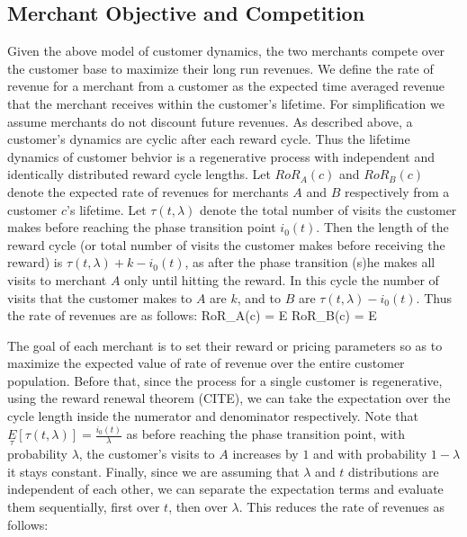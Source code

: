 \subsection{Merchant Objective and Competition}
Given the above model of customer dynamics, the two merchants compete over the customer base to maximize their long run revenues.
We define the rate of revenue for a merchant from a customer as the expected time averaged revenue that the merchant receives within the customer's lifetime.
For simplification we assume merchants do not discount future revenues.
As described above, a customer's dynamics are cyclic after each reward cycle.
Thus the lifetime dynamics of customer behvior is a regenerative process with independent and identically distributed reward cycle lengths.
Let $RoR_A(c)$ and $RoR_B(c)$ denote the expected rate of revenues for merchants $A$ and $B$ respectively from a customer $c$'s lifetime.
Let $\tau(t, \lambda)$ denote the total number of visits the customer makes before reaching the phase transition point $i_0(t)$.
Then the length of the reward cycle (or total number of visits the customer makes before receiving the reward) is $\tau(t, \lambda) + k - i_0(t)$, as after the phase transition (s)he makes all visits to merchant $A$ only until hitting the reward.
In this cycle the number of visits that the customer makes to $A$ are $k$, and to $B$ are $\tau(t,\lambda) - i_0(t)$.
Thus the rate of revenues are as follows:
\beq
RoR_A(c) = \underset{\tau}E
\eeq
\beq
RoR_B(c) = \underset{\tau}E
\eeq

The goal of each merchant is to set their reward or pricing parameters so as to maximize the expected value of rate of revenue over the entire customer population.
Before that, since the process for a single customer is regenerative, using the reward renewal theorem (CITE), we can take the expectation over the cycle length inside the numerator and denominator respectively.
Note that $\underset{\tau}E[\tau(t,\lambda)] = \frac{i_0(t)}{\lambda}$ as before reaching the phase transition point, with probability $\lambda$, the customer's visits to $A$ increases by $1$ and with probability $1-\lambda$ it stays constant.
Finally, since we are assuming that $\lambda$ and $t$ distributions are independent of each other, we can separate the expectation terms and evaluate them sequentially, first over $t$, then over $\lambda$. This reduces the rate of revenues as follows:

